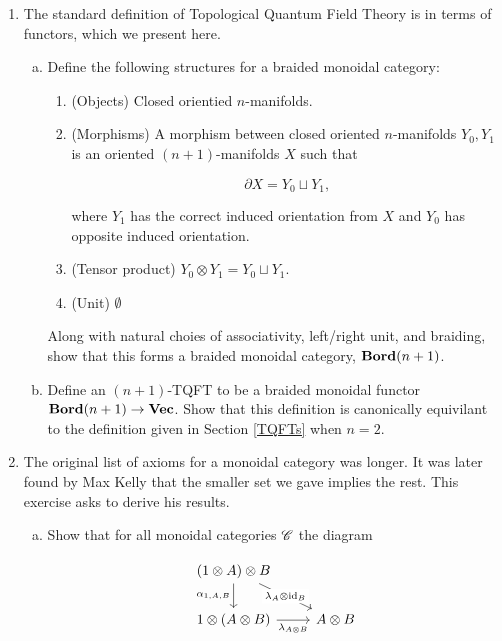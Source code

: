 \documentclass{article}
\theoremstyle{definition}
\numberwithin{figure}{section}
\begin{document}
\begin{enumerate}[\thesection .1.]
\item The standard definition of Topological Quantum Field Theory is in terms of functors, which we present here.

\begin{enumerate}[(a)]
\item Define the following structures for a braided monoidal category:

\begin{enumerate}
\item  (Objects) Closed orientied $n$-manifolds.

\item (Morphisms) A morphism between closed oriented $n$-manifolds $Y_0,Y_1$ is an oriented $(n+1)$-manifolds $X$ such that

$$\partial X = Y_0\sqcup Y_1,$$

where $Y_1$ has the correct induced orientation from $X$ and $Y_0$ has opposite induced orientation. 

\item (Tensor product) $Y_0\otimes Y_1 = Y_0\sqcup Y_1$.

\item (Unit) $\emptyset$
\end{enumerate}

Along with natural choies of associativity, left/right unit, and braiding, show that this forms a braided monoidal category, $\bold{Bord}(n+1)$.

\item Define an $(n+1)$-TQFT to be a braided monoidal functor $\bold{Bord}(n+1)\to \bold{Vec}$. Show that this definition is canonically equivilant to the definition given in Section \ref{TQFTs} when $n=2$.
\end{enumerate}

\item The original list of axioms for a monoidal category was longer. It was later found by Max Kelly \cite{kelly1964maclane} that the smaller set we gave implies the rest. This exercise asks to derive his results.

\begin{enumerate}[(a)]

\item Show that for all monoidal categories $\mathscr{C}$ the diagram

\[\begin{tikzcd}
	{(1\otimes A)\otimes B} \\
	{1\otimes (A\otimes B)} & {A\otimes B}
	\arrow["{\lambda_A\otimes\id_{B}}"{description}, from=1-1, to=2-2]
	\arrow["{\alpha_{1,A,B}}"', from=1-1, to=2-1]
	\arrow["{\lambda_{A\otimes B}}"', from=2-1, to=2-2]
\end{tikzcd}\]


\end{enumerate}
\end{enumerate}
\end{document}
